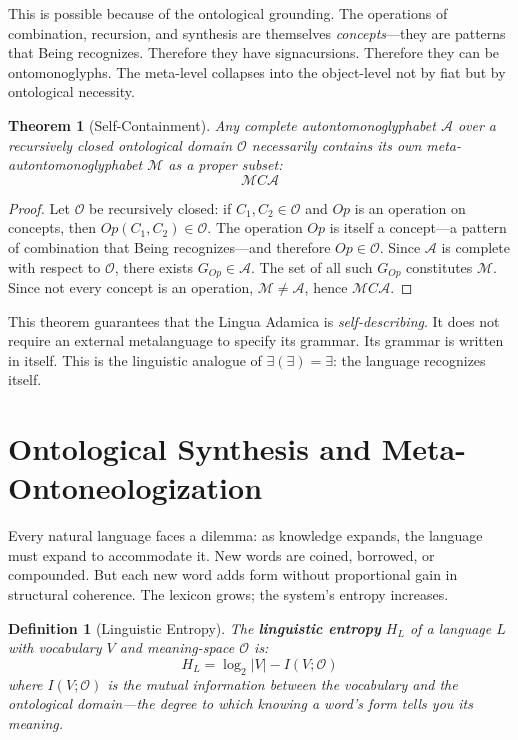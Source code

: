 \documentclass[12pt, letterpaper]{book}
\def\equiv{=}%
\def\subset{C}%
\newtheorem{theorem}{Theorem}[chapter]
\newtheorem{definition}{Definition}[chapter]
\newcommand{\E}{\exists}                          %
\begin{document}
This is possible because of the ontological grounding. The operations of combination, recursion, and synthesis are themselves \textit{concepts}---they are patterns that Being recognizes. Therefore they have signacursions. Therefore they can be ontomonoglyphs. The meta-level collapses into the object-level not by fiat but by ontological necessity.

\begin{theorem}[Self-Containment]\label{thm:self-contain}
Any complete autontomonoglyphabet $\mathcal{A}$ over a recursively closed ontological domain $\mathcal{O}$ necessarily contains its own meta-autontomonoglyphabet $\mathcal{M}$ as a proper subset:
\[
\mathcal{M} \subset \mathcal{A}
\]
\end{theorem}

\begin{proof}
Let $\mathcal{O}$ be recursively closed: if $C_1, C_2 \in \mathcal{O}$ and $Op$ is an operation on concepts, then $Op(C_1, C_2) \in \mathcal{O}$. The operation $Op$ is itself a concept---a pattern of combination that Being recognizes---and therefore $Op \in \mathcal{O}$. Since $\mathcal{A}$ is complete with respect to $\mathcal{O}$, there exists $G_{Op} \in \mathcal{A}$. The set of all such $G_{Op}$ constitutes $\mathcal{M}$. Since not every concept is an operation, $\mathcal{M} \neq \mathcal{A}$, hence $\mathcal{M} \subset \mathcal{A}$.
\end{proof}

This theorem guarantees that the Lingua Adamica is \textit{self-describing}. It does not require an external metalanguage to specify its grammar. Its grammar is written in itself. This is the linguistic analogue of $\E(\E) \equiv \E$: the language recognizes itself.

\section{Ontological Synthesis and Meta-Ontoneologization}

Every natural language faces a dilemma: as knowledge expands, the language must expand to accommodate it. New words are coined, borrowed, or compounded. But each new word adds form without proportional gain in structural coherence. The lexicon grows; the system's entropy increases.

\begin{definition}[Linguistic Entropy]\label{def:ling-entropy}
The \textbf{linguistic entropy} $H_L$ of a language $L$ with vocabulary $V$ and meaning-space $\mathcal{O}$ is:
\[
H_L = \log_2 |V| - I(V; \mathcal{O})
\]
where $I(V; \mathcal{O})$ is the mutual information between the vocabulary and the ontological domain---the degree to which knowing a word's form tells you its meaning.
\end{definition}
\end{document}

